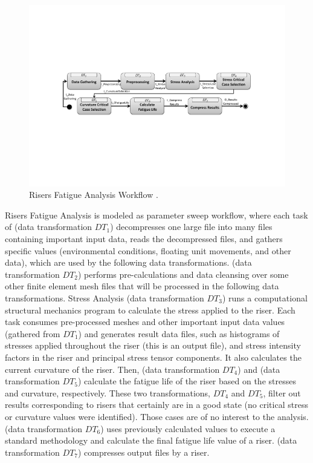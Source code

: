 \begin{figure}[H]
    \centering
    \includegraphics[width=\textwidth,keepaspectratio]{img/rfa.pdf}
    \caption{Risers Fatigue Analysis Workflow \cite{DetNorseVeritas2010Recommended}.}
    \label{fig:rfa_wf}
\end{figure}

Risers Fatigue Analysis is modeled as parameter sweep workflow, where each task of  (data transformation $DT_1$) decompresses one large file
into many files containing important input data, reads the decompressed
files, and gathers specific values (environmental conditions, floating
unit movements, and other data), which are used by the following
data transformations.  (data transformation $DT_2$) performs pre-calculations and
data cleansing over some other finite element mesh files that will be
processed in the following data transformations. Stress Analysis (data transformation $DT_3$) runs
a computational structural mechanics program to calculate the stress
applied to the riser. Each task consumes pre-processed meshes and other
important input data values (gathered from $DT_1$) and generates
result data files, such as histograms of stresses applied throughout the
riser (this is an output file), and stress intensity factors in the
riser and principal stress tensor components. It also calculates the
current curvature of the riser. Then, 
(data transformation $DT_4$) and  (data transformation $DT_5$)
calculate the fatigue life of the riser based on the stresses and
curvature, respectively. These two transformations, $DT_4$ and $DT_5$, filter out results
corresponding to risers that certainly are in a good state (no critical
stress or curvature values were identified). Those cases are of no
interest to the analysis.  (data transformation $DT_6$) uses
previously calculated values to execute a standard methodology
\cite{DetNorseVeritas2010Recommended}
and calculate the final fatigue life value of a riser.
(data transformation $DT_7$) compresses output files by a riser.



